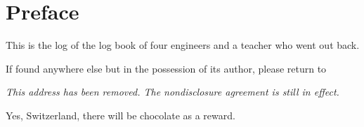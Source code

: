 \chapter{Preface}

This is the log of the log book of four engineers and a teacher who went out back.

\bigskip

If found anywhere else but in the possession of its author, please return to

\smallskip
\emph{This address has been removed. The nondisclosure agreement is still in effect.}
\smallskip

Yes, Switzerland, there will be chocolate as a reward.


